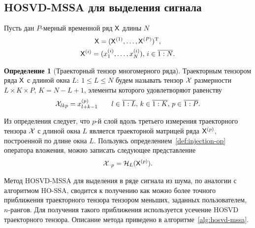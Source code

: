 \documentclass[specialist,
    substylefile = spbu_report.rtx,
    subf,href,colorlinks=true, 12pt]{disser}
\theoremstyle{plain}
\theoremstyle{definition}
\newtheorem{definition}{Определение}[section]
\theoremstyle{remark}
\begin{document}
    \subsection{HOSVD-MSSA для выделения сигнала}\label{subsec:Tensor-MSSA-method-signal-description}
    Пусть дан $P$-мерный временной ряд $\mathsf{X}$ длины $N$
    \begin{gather*}
        \mathsf{X} = (\mathsf{X}^{(1)}, \ldots, \mathsf{X}^{(P)})^{\mathrm{T}},\\
        \mathsf{X}^{(i)} = (x_1^{(i)}, \ldots, x_N^{(i)}),\, i \in \overline{1:N}.
    \end{gather*}

    \begin{definition}[Траекторный тензор многомерного ряда]
        Траекторным тензором ряда $\mathsf{X}$ с длиной окна $L:\: 1\leqslant L \leqslant N$ будем называть тензор $\mathcal{X}$
        размерности ${L \times K \times P}$, ${K = N - L + 1}$, элементы которого удовлетворяют равенству
        \[
            \mathcal{X}_{lkp}=x_{l+k-1}^{(p)} \qquad l \in \overline{1:L},\, k \in \overline{1:K},\, p \in \overline{1:P}.
        \]\label{def:trajectory-tensor-mssa}
    \end{definition}

    Из определения следует, что $p$-й слой вдоль третьего измерения траекторного тензора $\mathcal{X}$ с длиной окна $L$
    является траекторной матрицей ряда $\mathsf{X}^{(p)}$, построенной по длине окна $L$.
    Пользуясь определением~\ref{def:injection-op} оператора вложения, можно записать следующее представление
    \[
        \mathcal{X}_{\cdot \cdot p} = \mathcal{H}_L (\mathsf{X}^{(p)}).
    \]

    Метод HOSVD-MSSA для выделения в ряде сигнала из шума, по аналогии с алгоритмом HO-SSA,
    сводится к получению как можно более точного приближения траекторного тензора тензором меньших,
    заданных пользователем, $n$-рангов.
    Для получения такого приближения используется усечение HOSVD траекторного тензора.
    Описание метода приведено в алгоритме~\ref{alg:hosvd-mssa}.
\end{document}
